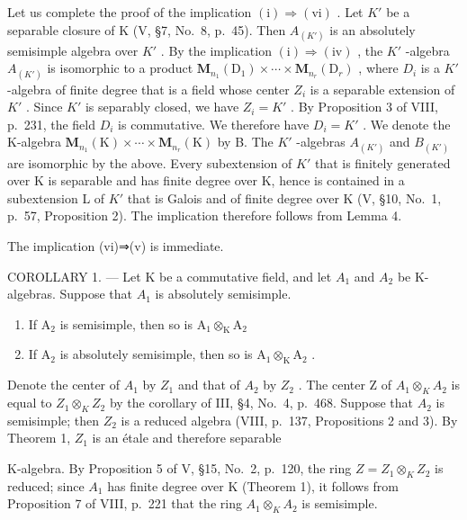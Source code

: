 Let us complete the proof of the implication \((\mathrm{i})\Rightarrow(\mathrm{vi})\) . Let \(K'\) be a separable closure of K (V, §7, No.~8, p.~45). Then \(A_{(K')}\) is an absolutely semisimple algebra over \(K'\) . By the implication \((\mathrm{i})\Rightarrow(\mathrm{iv})\) , the \(K'\) -algebra \(A_{(K')}\) is isomorphic to a product \(\mathbf{M}_{n_{1}}(\mathrm{D}_{1})\times\cdots\times\mathbf{M}_{n_{r}}(\mathrm{D}_{r})\) , where \(D_{i}\) is a \(K'\) -algebra of finite degree that is a field whose center \(Z_{i}\) is a separable extension of \(K'\) . Since \(K'\) is separably closed, we have \(Z_{i}=K'\) . By Proposition 3 of VIII, p.~231, the field \(D_{i}\) is commutative. We therefore have \(D_{i}=K'\) . We denote the K-algebra \(\mathbf{M}_{n_{1}}(\mathrm{K})\times\cdots\times\mathbf{M}_{n_{r}}(\mathrm{K})\) by B. The \(K'\) -algebras \(A_{(K')}\) and \(B_{(K')}\) are isomorphic by the above. Every subextension of \(K'\) that is finitely generated over K is separable and has finite degree over K, hence is contained in a subextension L of \(K'\) that is Galois and of finite degree over K (V, §10, No.~1, p.~57, Proposition 2). The implication therefore follows from Lemma 4.

The implication (vi)⇒(v) is immediate.

COROLLARY 1. --- Let K be a commutative field, and let \(A_{1}\) and \(A_{2}\) be K-algebras. Suppose that \(A_{1}\) is absolutely semisimple.

\begin{enumerate}
\def\labelenumi{\alph{enumi})}
\item
  If \(\mathrm{A}_2\) is semisimple, then so is \(\mathrm{A}_1\otimes_{\mathrm{K}}\mathrm{A}_2\)
\item
  If \(\mathrm{A}_2\) is absolutely semisimple, then so is \(\mathrm{A}_1\otimes_{\mathrm{K}}\mathrm{A}_2\) .
\end{enumerate}

Denote the center of \(A_{1}\) by \(Z_{1}\) and that of \(A_{2}\) by \(Z_{2}\) . The center Z of \(A_{1} \otimes_{K} A_{2}\) is equal to \(Z_{1} \otimes_{K} Z_{2}\) by the corollary of III, §4, No.~4, p.~468. Suppose that \(A_{2}\) is semisimple; then \(Z_{2}\) is a reduced algebra (VIII, p.~137, Propositions 2 and 3). By Theorem 1, \(Z_{1}\) is an étale and therefore separable

K-algebra. By Proposition 5 of V, §15, No.~2, p.~120, the ring \(Z = Z_{1} \otimes_{K} Z_{2}\) is reduced; since \(A_{1}\) has finite degree over K (Theorem 1), it follows from Proposition 7 of VIII, p.~221 that the ring \(A_{1} \otimes_{K} A_{2}\) is semisimple.

